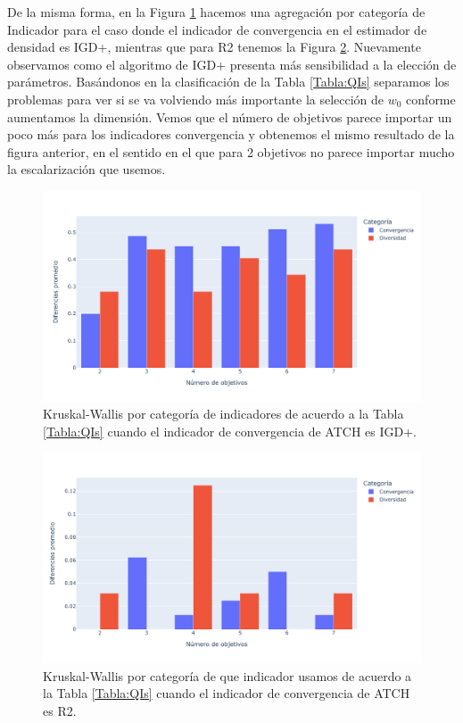 De la misma forma, en la Figura \ref{fig:KW_conv_dist_IGDp} hacemos una agregación por categoría de Indicador para el caso donde el indicador de convergencia en el estimador de densidad es IGD+, mientras que para R2 tenemos la Figura \ref{fig:KW_conv_dist_R2}. Nuevamente observamos como el algoritmo de IGD+ presenta más sensibilidad a la elección de parámetros. Basándonos en la clasificación de la Tabla \ref{Tabla:QIs} separamos los problemas para ver si se va volviendo más importante la selección de $w_0$ conforme aumentamos la dimensión. Vemos que el número de objetivos parece importar un poco más para los indicadores convergencia y obtenemos el mismo resultado de la figura anterior, en el sentido en el que para 2 objetivos no parece importar mucho la escalarización que usemos.

\begin{figure}[H]
    \centering
    \includegraphics[width=\textwidth]{Figuras/KW_Diferencia_por_categoria_IGD+.pdf}
    \caption[Kruskal-Wallis por categoría para IGD+.]{Kruskal-Wallis por categoría de indicadores de acuerdo a la Tabla \ref{Tabla:QIs} cuando el indicador de convergencia de ATCH es IGD+.}
    \label{fig:KW_conv_dist_IGDp}
\end{figure}

\begin{figure}[H]
    \centering
    \includegraphics[width=\textwidth]{Figuras/KW_Diferencia_por_categoria_R2.pdf}
    \caption[Kruskal-Wallis por categoría para R2.]{Kruskal-Wallis por categoría de que indicador usamos de acuerdo a la Tabla \ref{Tabla:QIs} cuando el indicador de convergencia de ATCH es R2.}
    \label{fig:KW_conv_dist_R2}
\end{figure}


